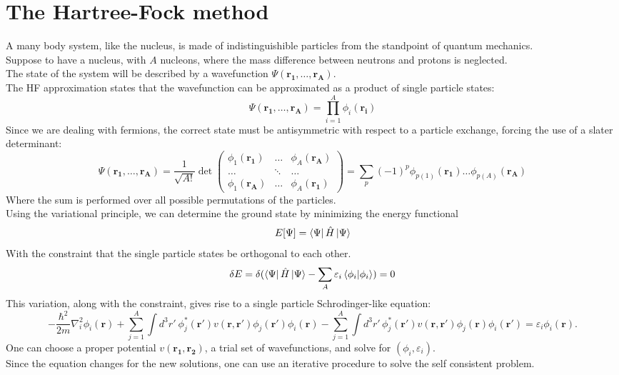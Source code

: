\section{The Hartree-Fock method}
A many body system, like the nucleus, is made of indistinguishible particles from the standpoint of quantum mechanics.
\\Suppose to have a nucleus, with $A$ nucleons, where the mass difference between neutrons and protons is neglected.
\\The state of the system will be described by a wavefunction $\Psi(\mathbf{r_1}, \ldots, \mathbf{r_A})$.
\\The HF approximation states that the wavefunction can be approximated as a product of single particle states:
\begin{equation}
    \Psi(\mathbf{r_1}, \ldots, \mathbf{r_A}) = \prod_{i=1}^A \phi_i(\mathbf{r_i})
\end{equation}
Since we are dealing with fermions, the correct state must be antisymmetric with respect to a particle exchange, forcing the use of a slater determinant:
\begin{equation}
    \Psi(\mathbf{r_1}, \ldots, \mathbf{r_A}) = \frac{1}{\sqrt{A!}}\det
    \begin{pmatrix}
        \phi_1(\mathbf{r_1}) & \ldots & \phi_A(\mathbf{r_A}) \\
        \ldots & \ddots & \ldots \\
        \phi_1(\mathbf{r_A}) & \ldots & \phi_A(\mathbf{r_1})
    \end{pmatrix}
    =\sum_{p} (-1)^p \phi_{p(1)}(\mathbf{r_1}) \ldots \phi_{p(A)}(\mathbf{r_A})
\end{equation}
Where the sum is performed over all possible permutations of the particles.
\\Using the variational principle, we can determine the ground state by minimizing the energy functional
\begin{equation}
    \label{eq:energy_functional}
    E[\Psi] = \bra{\Psi} \hat{H} \ket{\Psi}
\end{equation}
With the constraint that the single particle states be orthogonal to each other.
\begin{equation}
    \label{eq:energy_variation}
    \delta E = \delta(\bra{\Psi} \hat{H} \ket{\Psi} - \sum_A \varepsilon_i\braket{\phi_i | \phi_i} ) = 0
\end{equation}
This variation, along with the constraint, gives rise to a single particle Schrodinger-like equation:
\begin{equation}
-\frac{\hbar^2}{2m} \nabla_i^2 \phi_i(\mathbf{r}) + \sum_{j=1}^A \int d^3 r' \ \phi_j^*(\mathbf{r}') v(\mathbf{r}, \mathbf{r}') \phi_j(\mathbf{r}') \phi_i(\mathbf{r}) - \sum_{j=1}^A \int d^3 r' \, \phi_j^*(\mathbf{r}') v(\mathbf{r}, \mathbf{r}') \phi_j(\mathbf{r}) \phi_i(\mathbf{r}') = \varepsilon_i \phi_i(\mathbf{r}).
\end{equation}
One can choose a proper potential $v(\mathbf{r_1}, \mathbf{r_2})$, a trial set of wavefunctions, and solve for $(\phi_i, \varepsilon_i)$.
\\Since the equation changes for the new solutions, one can use an iterative procedure to solve the self consistent problem.
